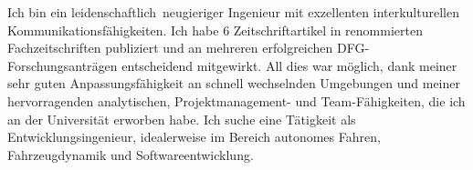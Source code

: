 \documentclass{mycv}
\newcommand{\CVRole}{Entwicklungsingenieur}
\newcommand{\CVFields}{autonomes Fahren, Fahrzeugdynamik und Softwareentwicklung}
\begin{document}
{\rlap{\color{templateColor1}\rule[0mm]{\textwidth}{\ulinewidth}}}
\setlength{\columnsep}{2.5em}
\setlength{\columnseprule}{\ulinewidth}
\begin{paracol}{2}

		Ich bin ein leidenschaftlich \,neugieriger
		Ingenieur mit exzellenten interkulturellen Kommunikationsfähigkeiten. Ich
		habe 6 Zeitschriftartikel in renommierten Fachzeitschriften publiziert
		und an mehreren erfolgreichen DFG-Forschungsantr{\"a}gen entscheidend
		mitgewirkt. All dies war möglich, dank meiner sehr guten
		Anpassungsf{\"a}higkeit an schnell wechselnden Umgebungen und meiner
		hervorragenden analytischen, Projektmanagement- und Team-F{\"a}higkeiten,
		die ich an der Universität erworben habe. Ich suche eine T{\"a}tigkeit als
		\CVRole, idealerweise im Bereich \CVFields.\\




\end{paracol}
\end{document}
